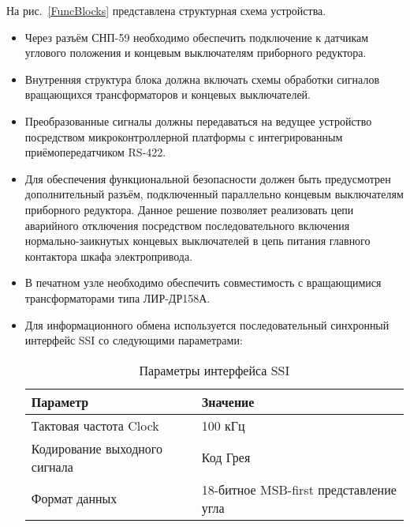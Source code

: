     На рис.~\ref{FuncBlocks} представлена структурная схема устройства. 
    \begin{itemize}
    \item Через разъём СНП-59  необходимо обеспечить подключение к датчикам углового положения и концевым выключателям приборного редуктора. 

    \item Внутренняя структура блока должна включать схемы обработки сигналов вращающихся трансформаторов и концевых выключателей. 

    \item Преобразованные сигналы должны передаваться на ведущее устройство посредством микроконтроллерной платформы с интегрированным приёмопередатчиком RS-422.
    
    \item Для обеспечения функциональной безопасности должен быть предусмотрен дополнительный разъём, подключенный параллельно концевым выключателям приборного редуктора. 
    Данное решение позволяет реализовать цепи аварийного отключения посредством последовательного включения нормально-заикнутых концевых выключателей 
    в цепь питания главного контактора шкафа электропривода.


    \item В печатном узле необходимо обеспечить совместимость с вращающимися трансформаторами типа ЛИР-ДР158А.

    \item Для информационного обмена используется последовательный синхронный интерфейс SSI \cite{SSI} со следующими параметрами:
        \begin{table}[h]
        \centering
        \begin{tabular}{|l|l|}
        \hline
        Параметр & Значение \\ \hline
        Тактовая частота Clock & 100 кГц \\ \hline
        Кодирование выходного сигнала & Код Грея \\ \hline
        Формат данных & 18-битное MSB-first представление угла \\ \hline
        \end{tabular}
        \caption{Параметры интерфейса SSI}
        \label{tab:ssi-params}
        \end{table}
\end{itemize}


